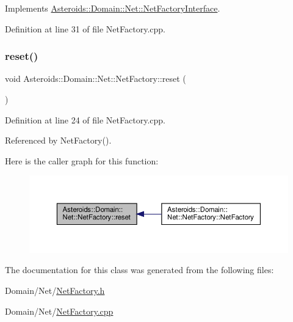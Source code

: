 Implements \hyperlink{classAsteroids_1_1Domain_1_1Net_1_1NetFactoryInterface_a933b03a4fcb601e4478409fdf5794168}{Asteroids\+::\+Domain\+::\+Net\+::\+Net\+Factory\+Interface}.



Definition at line 31 of file Net\+Factory.\+cpp.

\mbox{\label{classAsteroids_1_1Domain_1_1Net_1_1NetFactory_a7846015f917fa2d29700a8622e28fd8a}} 
\subsubsection{\texorpdfstring{reset()}{reset()}}
{\footnotesize\ttfamily void Asteroids\+::\+Domain\+::\+Net\+::\+Net\+Factory\+::reset (\begin{DoxyParamCaption}{ }\end{DoxyParamCaption})}



Definition at line 24 of file Net\+Factory.\+cpp.



Referenced by Net\+Factory().

Here is the caller graph for this function\+:\nopagebreak
\begin{figure}[H]
\begin{center}
\leavevmode
\includegraphics[width=350pt]{classAsteroids_1_1Domain_1_1Net_1_1NetFactory_a7846015f917fa2d29700a8622e28fd8a_icgraph}
\end{center}
\end{figure}


The documentation for this class was generated from the following files\+:\begin{DoxyCompactItemize}
\item 
Domain/\+Net/\hyperlink{NetFactory_8h}{Net\+Factory.\+h}\item 
Domain/\+Net/\hyperlink{NetFactory_8cpp}{Net\+Factory.\+cpp}\end{DoxyCompactItemize}
